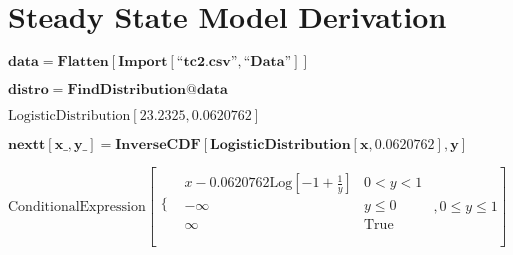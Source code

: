 
\section{Steady State Model Derivation}\label{steady-state-model-code}

\begin{doublespace}
\noindent\(\pmb{\text{data} = \text{Flatten}[\text{Import}[\text{{``}tc2.csv{''}},\text{{``}Data{''}}]]}\)
\end{doublespace}

\begin{doublespace}
\noindent\(\pmb{\text{distro} = \text{FindDistribution}@\text{data}}\)
\end{doublespace}

\begin{doublespace}
\noindent\(\text{LogisticDistribution}[23.2325,0.0620762]\)
\end{doublespace}

\begin{doublespace}
\noindent\(\pmb{\text{nextt}[\text{x$\_$},\text{y$\_$}]=\text{InverseCDF}[\text{LogisticDistribution}[x,0.0620762],y]}\)
\end{doublespace}

\begin{doublespace}
\noindent\(\text{ConditionalExpression}\left[
\begin{array}{ll}
 \{ & 
\begin{array}{ll}
 x-0.0620762 \text{Log}\left[-1+\frac{1}{y}\right] & 0<y<1 \\
 -\infty  & y\leq 0 \\
 \infty  & \text{True} \\
\end{array}
 \\
\end{array}
,0\leq y\leq 1\right]\)
\end{doublespace}

